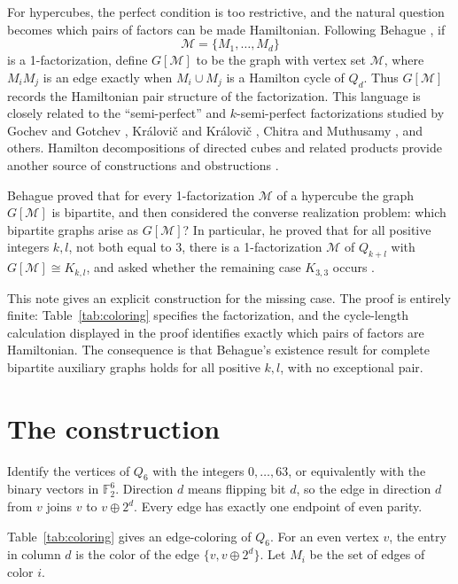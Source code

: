 \documentclass[preprint,12pt]{elsarticle}
\newcommand{\Q}{Q_6}
\newcommand{\M}{\mathcal M}
\begin{document}
For hypercubes, the perfect condition is too restrictive, and the natural
question becomes which pairs of factors can be made Hamiltonian. Following
Behague \cite{behague}, if
\[
  \M=\{M_1,\dots,M_d\}
\]
is a 1-factorization, define \(G[\M]\) to be the graph with vertex set
\(\M\), where \(M_iM_j\) is an edge exactly when \(M_i\cup M_j\) is a
Hamilton cycle of \(Q_d\). Thus \(G[\M]\) records the Hamiltonian pair
structure of the factorization. This language is closely related to the
``semi-perfect'' and \(k\)-semi-perfect factorizations studied by Gochev and
Gotchev \cite{gochev_gotchev}, Kr\'alovi\v{c} and Kr\'alovi\v{c}
\cite{kralovic_kralovic}, Chitra and Muthusamy \cite{chitra_muthusamy}, and
others. Hamilton decompositions of directed cubes and related products provide
another source of constructions and obstructions \cite{stong}.

Behague proved that for every 1-factorization \(\M\) of a hypercube the graph
\(G[\M]\) is bipartite, and then considered the converse realization problem:
which bipartite graphs arise as \(G[\M]\)? In particular, he proved that for
all positive integers \(k,l\), not both equal to \(3\), there is a
1-factorization \(\M\) of \(Q_{k+l}\) with \(G[\M]\cong K_{k,l}\), and asked
whether the remaining case \(K_{3,3}\) occurs \cite[Theorem 2 and Open Problem
8]{behague}.

This note gives an explicit construction for the missing case. The proof is
entirely finite: Table~\ref{tab:coloring} specifies the factorization, and the
cycle-length calculation displayed in the proof identifies exactly which
pairs of factors are Hamiltonian. The consequence is that Behague's existence
result for complete bipartite auxiliary graphs holds for all positive
\(k,l\), with no exceptional pair.

\section{The construction}

Identify the vertices of \(\Q\) with the integers \(0,\dots,63\), or
equivalently with the binary vectors in \(\mathbb F_2^6\). Direction \(d\)
means flipping bit \(d\), so the edge in direction \(d\) from \(v\) joins
\(v\) to \(v\oplus 2^d\). Every edge has exactly one endpoint of even parity.

Table~\ref{tab:coloring} gives an edge-coloring of \(\Q\). For an even vertex
\(v\), the entry in column \(d\) is the color of the edge
\(\{v,v\oplus 2^d\}\). Let \(M_i\) be the set of edges of color \(i\).
\end{document}
